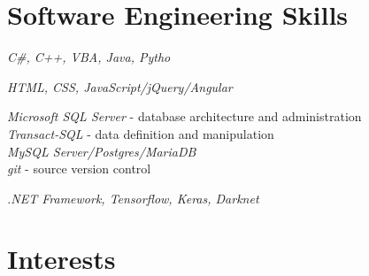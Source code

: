 \documentclass[10pt]{article} %
\begin{document}



\section{Software Engineering Skills}

{
\textit{C\#, C++, VBA, Java, Pytho}\\
}


{
\textit{HTML, CSS, JavaScript/jQuery/Angular}\\
}


{
\textit{Microsoft SQL Server} - database architecture and administration\\
\textit{Transact-SQL} - data definition and manipulation\\
\textit{MySQL Server/Postgres/MariaDB}\\
\textit{git} - source version control
}


{
\textit{.NET Framework, Tensorflow, Keras, Darknet}
}


\section{Interests}

\end{document}
